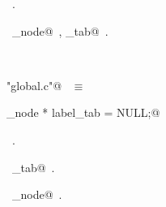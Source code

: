 \documentclass{report}
\begin{document}
\begin{flushleft}
\begin{minipage}{\linewidth}
\vspace{-1ex}
\footnotesize\addtolength{\baselineskip}{-1ex}
\begin{list}{}{\setlength{\itemsep}{-\parsep}\setlength{\itemindent}{-\leftmargin}}
\item \NWtxtMacroRefIn\ .
\end{list}
\vspace{-2ex}
\footnotesize\addtolength{\baselineskip}{-1ex}
\begin{list}{}{\setlength{\itemsep}{-\parsep}\setlength{\itemindent}{-\leftmargin}}
\item \NWtxtIdentsUsed\nobreak\  \verb@label_node@\nobreak\ , \verb@label_tab@\nobreak\ .\end{list}
\end{minipage}\\[4ex]
\end{flushleft}
\begin{flushleft} \small
\begin{minipage}{\linewidth} \label{scrap252}
\verb@"global.c"@\nobreak\ {\footnotesize {} }$\equiv$
\vspace{-1ex}
\begin{list}{}{} \item
\mbox{}\verb@label_node * label_tab = NULL;@\\
\mbox{}\verb@@{\NWsep}
\end{list}
\vspace{-1ex}
\footnotesize\addtolength{\baselineskip}{-1ex}
\begin{list}{}{\setlength{\itemsep}{-\parsep}\setlength{\itemindent}{-\leftmargin}}
\item \NWtxtFileDefBy\ .
\end{list}
\vspace{-2ex}
\footnotesize\addtolength{\baselineskip}{-1ex}
\begin{list}{}{\setlength{\itemsep}{-\parsep}\setlength{\itemindent}{-\leftmargin}}
\item \NWtxtIdentsDefed\nobreak\  \verb@label_tab@\nobreak\ .\end{list}
\vspace{-2ex}
\footnotesize\addtolength{\baselineskip}{-1ex}
\begin{list}{}{\setlength{\itemsep}{-\parsep}\setlength{\itemindent}{-\leftmargin}}
\item \NWtxtIdentsUsed\nobreak\  \verb@label_node@\nobreak\ .\end{list}
\end{minipage}\\[4ex]
\end{flushleft}
\end{document}
